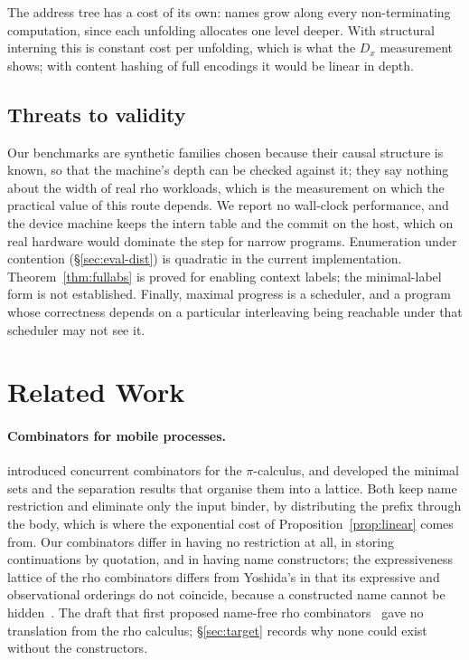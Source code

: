 \documentclass[acmsmall,screen,review,anonymous]{acmart}
\begin{document}
The address tree has a cost of its own: names grow along every
non-terminating computation, since each unfolding allocates one level deeper.
With structural interning this is constant cost per unfolding, which is what
the $D_{x}$ measurement shows; with content hashing of full encodings it would
be linear in depth.

\subsection{Threats to validity}

Our benchmarks are synthetic families chosen because their causal structure
is known, so that the machine's depth can be checked against it; they say
nothing about the width of real rho workloads, which is the measurement on
which the practical value of this route depends. We report no wall-clock
performance, and the device machine keeps the intern table and the commit on
the host, which on real hardware would dominate the step for narrow programs.
Enumeration under contention (\S\ref{sec:eval-dist}) is quadratic in the
current implementation. Theorem~\ref{thm:fullabs} is proved for enabling
context labels; the minimal-label form is not established. Finally, maximal
progress is a scheduler, and a program whose correctness depends on a
particular interleaving being reachable under that scheduler may not see it.

\section{Related Work}
\label{sec:related}

\paragraph{Combinators for mobile processes.}
\citet{HondaYoshida94} introduced concurrent combinators for the
$\pi$-calculus, and \citet{Yoshida02} developed the minimal sets and the
separation results that organise them into a lattice. Both keep name
restriction and eliminate only the input binder, by distributing the prefix
through the body, which is where the exponential cost of
Proposition~\ref{prop:linear} comes from. Our combinators differ in having no
restriction at all, in storing continuations by quotation, and in having name
constructors; the expressiveness lattice of the rho combinators differs from
Yoshida's in that its expressive and observational orderings do not coincide,
because a constructed name cannot be hidden~\cite{AnonRhocomb}. The draft that
first proposed name-free rho combinators~\cite{AnonOriginal} gave no
translation from the rho calculus; \S\ref{sec:target} records why none could
exist without the constructors.
\end{document}
